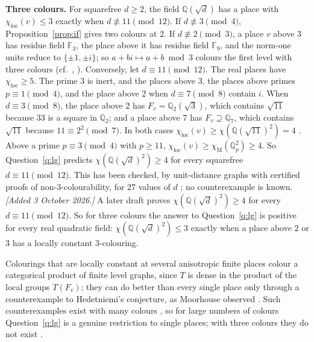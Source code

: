 \documentclass[11pt,a4paper]{amsart}
\theoremstyle{definition}
\newcommand{\F}{\mathbb{F}}
\newcommand{\Q}{\mathbb{Q}}
\newcommand{\chiM}{\chi_{\mathrm{M}}}
\newcommand{\chiloc}{\chi_{\mathrm{loc}}}
\begin{document}
\textbf{Three colours.} For squarefree $d\ge2$, the field $\Q(\sqrt d)$ has a place with $\chiloc(v)\le3$ exactly
when $d\not\equiv11\pmod{12}$. If $d\not\equiv3\pmod4$, Proposition~\ref{prop:if} gives two colours at $2$. If
$d\not\equiv2\pmod3$, a place $v$ above $3$ has residue field $\F_3$, the place above it has residue field $\F_9$,
and the norm-one units reduce to $\{\pm1,\pm i\}$; so $a+bi\mapsto a+b\bmod3$ colours the first level with three
colours (cf.\ \cite[Proposition~3.2]{Madore}, \cite[Theorem~9]{Fischer1990}). Conversely, let
$d\equiv11\pmod{12}$. The real places have $\chiloc\ge5$. The prime $3$ is inert, and the places above $3$, the
places above primes $p\equiv1\pmod4$, and the place above $2$ when $d\equiv7\pmod8$ contain $i$. When
$d\equiv3\pmod8$, the place above $2$ has $F_v=\Q_2(\sqrt3)$, which contains $\sqrt{11}$ because $33$ is a square
in $\Q_2$; and a place above $7$ has $F_v\supseteq\Q_7$, which contains $\sqrt{11}$ because $11\equiv2^2\pmod7$.
In both cases $\chiloc(v)\ge\chi(\Q(\sqrt{11})^2)=4$ \cite{QP}. Above a prime $p\equiv3\pmod4$ with $p\ge11$,
$\chiloc(v)\ge\chiM(\Q_p^2)\ge4$. So Question~\ref{q:lg} predicts
$\chi(\Q(\sqrt d)^2)\ge4$ for every squarefree $d\equiv11\pmod{12}$. This has been checked, by unit-distance
graphs with certified proofs of non-$3$-colourability, for $27$ values of $d$ \cite{QP}; no counterexample is
known. \emph{[Added 3 October 2026.]} A later draft \cite{FC} proves $\chi(\Q(\sqrt d)^2)\ge4$ for every
$d\equiv11\pmod{12}$. So for three colours the answer to Question~\ref{q:lg} is positive for every real quadratic
field: $\chi(\Q(\sqrt d)^2)\le3$ exactly when a place above $2$ or $3$ has a locally constant $3$-colouring.

Colourings that are locally constant at several anisotropic finite places colour a categorical product of finite
level graphs, since $T$ is dense in the product of the local groups $T(F_v)$; they can do better than every
single place only through a counterexample to Hedetniemi's conjecture, as Moorhouse observed
\cite[\S9]{Moorhouse}. Such counterexamples exist with many colours \cite{Shitov}, so for large numbers of colours
Question~\ref{q:lg} is a genuine restriction to single places; with three colours they do not exist \cite{EZS}.
\end{document}
